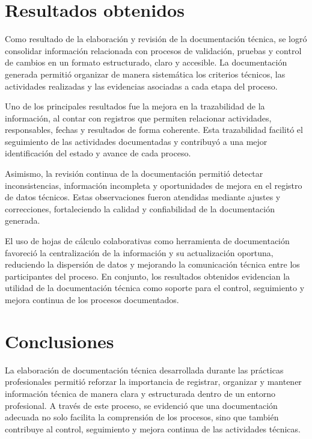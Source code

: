 \documentclass[12pt]{article}
\begin{document}
\section*{Resultados obtenidos}

Como resultado de la elaboración y revisión de la documentación técnica, se logró consolidar información relacionada con procesos de validación, pruebas y control de cambios en un formato estructurado, claro y accesible. La documentación generada permitió organizar de manera sistemática los criterios técnicos, las actividades realizadas y las evidencias asociadas a cada etapa del proceso.

Uno de los principales resultados fue la mejora en la trazabilidad de la información, al contar con registros que permiten relacionar actividades, responsables, fechas y resultados de forma coherente. Esta trazabilidad facilitó el seguimiento de las actividades documentadas y contribuyó a una mejor identificación del estado y avance de cada proceso.

Asimismo, la revisión continua de la documentación permitió detectar inconsistencias, información incompleta y oportunidades de mejora en el registro de datos técnicos. Estas observaciones fueron atendidas mediante ajustes y correcciones, fortaleciendo la calidad y confiabilidad de la documentación generada.

El uso de hojas de cálculo colaborativas como herramienta de documentación favoreció la centralización de la información y su actualización oportuna, reduciendo la dispersión de datos y mejorando la comunicación técnica entre los participantes del proceso. En conjunto, los resultados obtenidos evidencian la utilidad de la documentación técnica como soporte para el control, seguimiento y mejora continua de los procesos documentados.


\section*{Conclusiones}

La elaboración de documentación técnica desarrollada durante las prácticas profesionales permitió reforzar la importancia de registrar, organizar y mantener información técnica de manera clara y estructurada dentro de un entorno profesional. A través de este proceso, se evidenció que una documentación adecuada no solo facilita la comprensión de los procesos, sino que también contribuye al control, seguimiento y mejora continua de las actividades técnicas.
\end{document}
